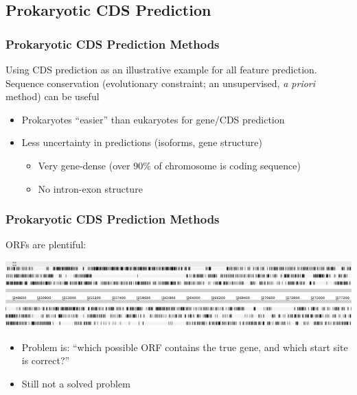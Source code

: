 
\subsection{Prokaryotic CDS Prediction}

\begin{frame}
  \frametitle{Prokaryotic CDS Prediction Methods}
  Using CDS prediction as an illustrative example for all feature prediction.\\[0.2cm]
  Sequence conservation (evolutionary constraint; an unsupervised, \textit{a priori} method) can be useful
  \begin{itemize}
    \item Prokaryotes ``easier'' than eukaryotes for gene/CDS prediction
    \item Less uncertainty in predictions (isoforms, gene structure)
    \begin{itemize}
      \item Very gene-dense (over 90\% of chromosome is coding sequence)
      \item No intron-exon structure
    \end{itemize}       
  \end{itemize}
\end{frame}

\begin{frame}
  \frametitle{Prokaryotic CDS Prediction Methods}
  ORFs are plentiful:
  \begin{center}
    \includegraphics[width=1\textwidth]{images/orfs}     
  \end{center}  
    \begin{itemize}
      \item Problem is: ``which possible ORF contains the true gene, and which start site is correct?''
      \item Still not a solved problem
    \end{itemize}       
\end{frame}

